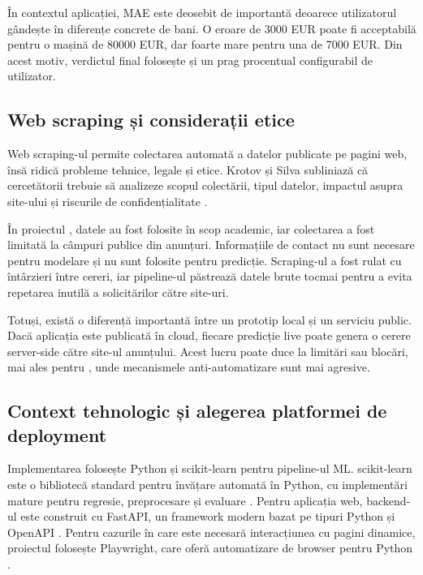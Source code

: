 În contextul aplicației, MAE este deosebit de importantă deoarece utilizatorul gândește în diferențe concrete de bani. O eroare de 3000 EUR poate fi acceptabilă pentru o mașină de 80000 EUR, dar foarte mare pentru una de 7000 EUR. Din acest motiv, verdictul final folosește și un prag procentual configurabil de utilizator.

\subsection{Web scraping și considerații etice}
\label{sec:background-scraping}

Web scraping-ul permite colectarea automată a datelor publicate pe pagini web, însă ridică probleme tehnice, legale și etice. Krotov și Silva subliniază că cercetătorii trebuie să analizeze scopul colectării, tipul datelor, impactul asupra site-ului și riscurile de confidențialitate \cite{krotov2018webscraping}.

În proiectul \project, datele au fost folosite în scop academic, iar colectarea a fost limitată la câmpuri publice din anunțuri. Informațiile de contact nu sunt necesare pentru modelare și nu sunt folosite pentru predicție. Scraping-ul a fost rulat cu întârzieri între cereri, iar pipeline-ul păstrează datele brute tocmai pentru a evita repetarea inutilă a solicitărilor către site-uri.

Totuși, există o diferență importantă între un prototip local și un serviciu public. Dacă aplicația este publicată în cloud, fiecare predicție live poate genera o cerere server-side către site-ul anunțului. Acest lucru poate duce la limitări sau blocări, mai ales pentru \mobilede, unde mecanismele anti-automatizare sunt mai agresive.

\subsection{Context tehnologic și alegerea platformei de deployment}
\label{sec:background-tech}

Implementarea folosește Python și scikit-learn pentru pipeline-ul ML. scikit-learn este o bibliotecă standard pentru învățare automată în Python, cu implementări mature pentru regresie, preprocesare și evaluare \cite{pedregosa2011scikit}. Pentru aplicația web, backend-ul este construit cu FastAPI, un framework modern bazat pe tipuri Python și OpenAPI \cite{fastapi_docs}. Pentru cazurile în care este necesară interacțiunea cu pagini dinamice, proiectul folosește Playwright, care oferă automatizare de browser pentru Python \cite{playwright_docs}.

